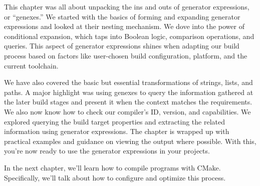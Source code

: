 

This chapter was all about unpacking the ins and outs of generator expressions, or “genexes.” We started with the basics of forming and expanding generator expressions and looked at their nesting mechanism. We dove into the power of conditional expansion, which taps into Boolean logic, comparison operations, and queries. This aspect of generator expressions shines when adapting our build process based on factors like user-chosen build configuration, platform, and the current toolchain.

We have also covered the basic but essential transformations of strings, lists, and paths. A major highlight was using genexes to query the information gathered at the later build stages and present it when the context matches the requirements. We also now know how to check our compiler’s ID, version, and capabilities. We explored querying the build target properties and extracting the related information using generator expressions. The chapter is wrapped up with practical examples and guidance on viewing the output where possible. With this, you’re now ready to use the generator expressions in your projects.

In the next chapter, we’ll learn how to compile programs with CMake. Specifically, we’ll talk about how to configure and optimize this process.
